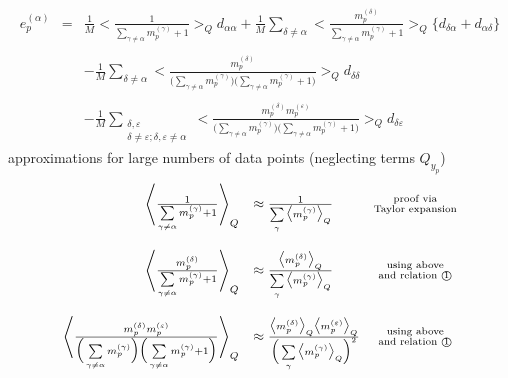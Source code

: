 \documentclass[a4paper,11pt]{article}
\begin{document}
\begin{equation}
	\begin{array}{lll}
	e_p^{(\alpha)} 
	& = & \frac{1}{M} \Bigg< \frac{1}{\sum\limits_{\gamma \neq \alpha}
		m_p^{(\gamma)} + 1} \Bigg>_Q d_{\alpha\alpha} 
		+ \frac{1}{M} \sum\limits_{\delta \neq \alpha} \Bigg<
			\frac{m_p^{(\delta)}}{\sum\limits_{\gamma \neq \alpha}
				m_p^{(\gamma)} + 1} \Bigg>_Q
		\big\{ d_{\delta\alpha} + d_{\alpha\delta} \big\} \\\\
	&& - \frac{1}{M} \sum\limits_{\delta \neq \alpha} \Bigg<
		\frac{m_p^{(\delta)}}{
		\Big(\sum\limits_{\gamma \neq \alpha} m_p^{(\gamma)} \Big)
		\Big(\sum\limits_{\gamma \neq \alpha} m_p^{(\gamma)} + 1 \Big)}
		\Bigg>_Q d_{\delta\delta} \\\\
	&& - \frac{1}{M} \sum\limits_{\substack{\delta, \varepsilon \\
		\delta \neq \varepsilon; \delta,\varepsilon \neq \alpha}} \Bigg<
		\frac{m_p^{(\delta)} m_p^{(\varepsilon)}}{
		\Big(\sum\limits_{\gamma \neq \alpha} m_p^{(\gamma)} \Big)
		\Big(\sum\limits_{\gamma \neq \alpha} m_p^{(\gamma)} + 1 \Big)}
		\Bigg>_Q d_{\delta\varepsilon}
	\end{array}
\end{equation}
approximations for large numbers of data points (neglecting terms $Q_{y_p}$)
\begin{equation}
	\begin{array}{rlc}
		\Bigg< \frac{1}{\sum\limits_{\gamma \neq \alpha}
			m_p^{(\gamma)} + 1} \Bigg>_Q
		& \approx \frac{1}{\sum\limits_\gamma \big< m_p^{(\gamma)} 
			\big>_Q}
		& \substack{\text{proof via} \\ \text{Taylor expansion}} \\\\
		\Bigg< \frac{m_p^{(\delta)}}{\sum\limits_{\gamma \neq \alpha}
			m_p^{(\gamma)} + 1} \Bigg>_Q
		& \approx \frac{\big< m_p^{(\delta)} \big>_Q}{
			\sum\limits_\gamma \big< m_p^{(\gamma)} \big>_Q}
		& \substack{\text{using above} \\ 
			\text{and relation \textcircled{1}}} \\\\
		\Bigg< \frac{m_p^{(\delta)} m_p^{(\varepsilon)}}{
		\Big(\sum\limits_{\gamma \neq \alpha} m_p^{(\gamma)} \Big)
		\Big(\sum\limits_{\gamma \neq \alpha} m_p^{(\gamma)} + 1 \Big)}
		\Bigg>_Q
		& \approx \frac{ \big< m_p^{(\delta)} \big>_Q 
			\big< m_p^{(\varepsilon)} \big>_Q}{
		\Big(\sum\limits_{\gamma} \big< m_p^{(\gamma)} \big>_Q \Big)^2}
		& \substack{\text{using above} \\ 
			\text{and relation \textcircled{1}}}
	\end{array}
\end{equation}
\end{document}

